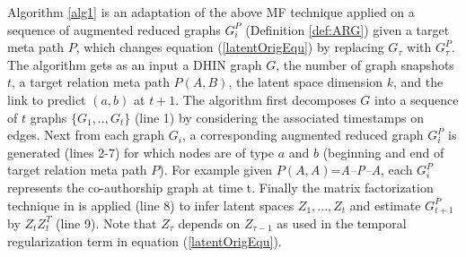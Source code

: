 Algorithm \ref{alg1} is an adaptation of the above MF technique applied on a sequence of augmented reduced graphs $G^P_i$ (Definition \ref{def:ARG}) given a target meta path $P$, which changes equation (\ref{latentOrigEqu}) by replacing $G_\tau$ with $G^{P}_\tau$.
The algorithm gets as an input a DHIN graph $G$, the number of graph snapshots $t$, a target relation meta path $P(A,B)$, the latent space dimension $k$, and the link to predict $(a,b)$ at $t+1$. The algorithm first decomposes $G$ into a sequence of $t$ graphs $\{G_1, .., G_t\}$ (line 1) by considering the associated timestamps on edges. Next from each graph $G_i$, a corresponding augmented reduced graph $G^P_i$ is generated (lines 2-7) for which nodes are of type $a$ and $b$ (beginning and end of target relation meta path $P$). For example given $P(A,A)$=\textit{A--P--A}, each $G^P_i$ represents the co-authorship graph at time t. Finally the matrix factorization technique in \cite{Zhu2016} is applied (line 8) to infer latent spaces $Z_1, ...,Z_t$ and estimate $G^P_{t+1}$ by $Z_tZ_t^T$ (line 9). Note that $Z_\tau$ depends on $Z_{\tau-1}$ as used in the temporal regularization term in equation (\ref{latentOrigEqu}).



